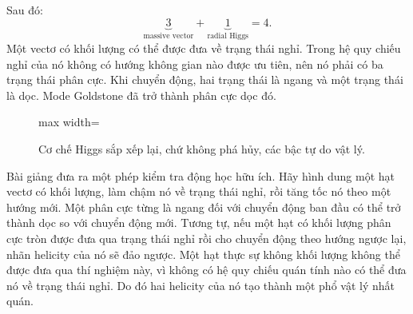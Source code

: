 Sau đó:
\begin{equation}
  \underbrace{3}_{\text{massive vector}}
  +
  \underbrace{1}_{\text{radial Higgs}}
  =4.
  \label{eq:l08-degree-count}
\end{equation}
Một vectơ có khối lượng có thể được đưa về trạng thái nghỉ. Trong hệ quy chiếu nghỉ
của nó không có hướng không gian nào được ưu tiên, nên nó phải có ba trạng thái
phân cực. Khi chuyển động, hai trạng thái là ngang và một trạng thái là dọc. Mode
Goldstone đã trở thành phân cực dọc đó.

\begin{figure}[htbp]
\centering
\begin{adjustbox}{max width=\linewidth}
\end{adjustbox}
\caption{Cơ chế Higgs sắp xếp lại, chứ không phá hủy, các bậc tự do
vật lý.}
\label{fig:l08-degree-rearrangement}
\end{figure}

\begin{classroomqa}
\end{classroomqa}

Bài giảng đưa ra một phép kiểm tra động học hữu ích. Hãy hình dung một hạt vectơ có
khối lượng, làm chậm nó về trạng thái nghỉ, rồi tăng tốc nó theo một hướng mới.
Một phân cực từng là ngang đối với chuyển động ban đầu có thể trở thành dọc so với
chuyển động mới. Tương tự, nếu một hạt có khối lượng phân cực tròn được đưa qua
trạng thái nghỉ rồi cho chuyển động theo hướng ngược lại, nhãn helicity của nó sẽ
đảo ngược. Một hạt thực sự không khối lượng không thể được đưa qua thí nghiệm này,
vì không có hệ quy chiếu quán tính nào có thể đưa nó về trạng thái nghỉ. Do đó hai
helicity của nó tạo thành một phổ vật lý nhất quán.

